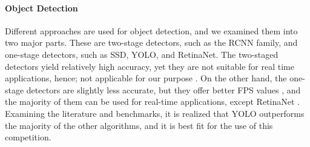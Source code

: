 \documentclass[12pt]{article}
\begin{document}
\paragraph{Object Detection}
\justify Different approaches are used for object detection, and we examined them into two major parts. These are two-stage detectors, such as the RCNN family, and one-stage detectors, such as SSD, YOLO, and RetinaNet. The two-staged detectors yield relatively high accuracy, yet they are not suitable for real time applications, hence; not applicable for our purpose \cite{redmon2018yolov3,zhang2018fast, li2020agricultural}. On the other hand, the one-stage detectors are slightly less accurate, but they offer better FPS values \cite{zhang2018fast}, and the majority of them can be used for real-time applications, except RetinaNet \cite{zhang2018fast}.
\justify Examining the literature and benchmarks, it is realized that YOLO outperforms the majority of the other algorithms, and it is best fit for the use of this competition.
\end{document}
